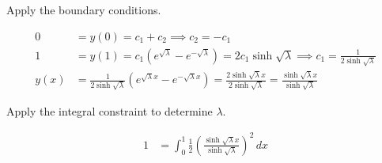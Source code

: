 \documentclass[12pt]{article}
\begin{document}
\begin{enumerate}
Apply the boundary conditions.

\begin{align*}
0 &= y(0) = c_1 + c_2 \implies c_2 = -c_1\\
1 &= y(1) = c_1 \left(e^{\sqrt{\lambda}} -e^{-\sqrt{\lambda}} \right) = 2c_1 \sinh \sqrt{\lambda} \implies c_1 = \frac{1}{2\sinh \sqrt{ \lambda}} \\
y(x) &= \frac{1}{2\sinh \sqrt{ \lambda}}\left(e^{\sqrt{\lambda} x} -e^{-\sqrt{\lambda} x} \right) = \frac{2\sinh \sqrt{\lambda}x }{2\sinh \sqrt{ \lambda}} = \frac{\sinh \sqrt{ \lambda}x }{\sinh \sqrt{ \lambda}}
\end{align*}

Apply the integral constraint to determine $\lambda$. 

\begin{align*}
1 &= \int_0^1 \frac{1}{2}\left(\frac{\sinh \sqrt{ \lambda}x }{\sinh \sqrt{ \lambda}}\right)^2 \, dx 
\end{align*}
\end{enumerate}
\end{document}
